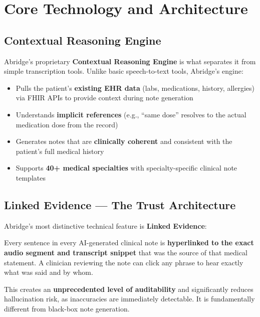 \documentclass[12pt,a4paper]{article}
\begin{document}
\newpage

\section{Core Technology and Architecture}

\subsection{Contextual Reasoning Engine}

Abridge's proprietary \textbf{Contextual Reasoning Engine} is what separates it from simple transcription tools. Unlike basic speech-to-text tools, Abridge's engine:

\begin{itemize}[noitemsep]
    \item Pulls the patient's \textbf{existing EHR data} (labs, medications, history, allergies) via FHIR APIs to provide context during note generation
    \item Understands \textbf{implicit references} (e.g., ``same dose'' resolves to the actual medication dose from the record)
    \item Generates notes that are \textbf{clinically coherent} and consistent with the patient's full medical history
    \item Supports \textbf{40+ medical specialties} with specialty-specific clinical note templates
\end{itemize}

\subsection{Linked Evidence --- The Trust Architecture}

Abridge's most distinctive technical feature is \textbf{Linked Evidence}:

\begin{mdframed}[backgroundcolor=lightgray, linecolor=primaryblue, linewidth=1pt, roundcorner=5pt]
Every sentence in every AI-generated clinical note is \textbf{hyperlinked to the exact audio segment and transcript snippet} that was the source of that medical statement. A clinician reviewing the note can click any phrase to hear exactly what was said and by whom.
\end{mdframed}

This creates an \textbf{unprecedented level of auditability} and significantly reduces hallucination risk, as inaccuracies are immediately detectable. It is fundamentally different from black-box note generation.
\end{document}
